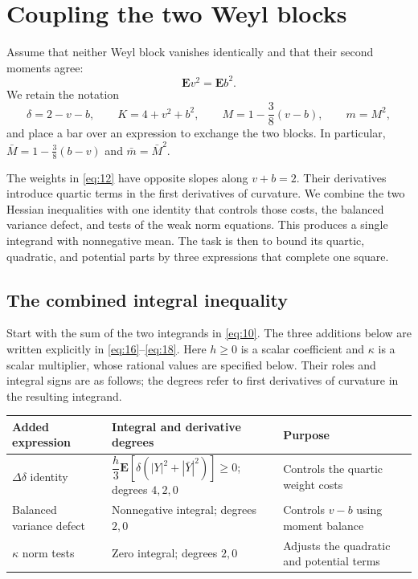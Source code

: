 \section{Coupling the two Weyl blocks}\label{sec:coupling}

Assume that neither Weyl block vanishes identically and that their second
moments agree:
\[
 \mathbf E v^2=\mathbf E b^2.
\]
We retain the notation
\[
 \delta=2-v-b,\qquad K=4+v^2+b^2,\qquad
 M=1-\frac38(v-b),\qquad m=M^2,
\]
and place a bar over an expression to exchange the two blocks. In
particular, $\bar M=1-\frac38(b-v)$ and $\bar m=\bar M^2$.

The weights in \eqref{eq:12} have opposite slopes along $v+b=2$.
Their derivatives introduce quartic terms in the first derivatives of
curvature. We combine the two Hessian inequalities with one identity that
controls those costs, the balanced variance defect, and tests of the weak
norm equations. This produces a single integrand with nonnegative mean.
The task is then to bound its quartic, quadratic, and potential parts by
three expressions that complete one square.

\subsection{The combined integral inequality}

Start with the sum of the two integrands in \eqref{eq:10}. The three
additions below are written explicitly in \eqref{eq:16}--\eqref{eq:18}.
Here $h\ge0$ is a scalar coefficient and $\kappa$ is a scalar multiplier,
whose rational values are specified below. Their roles and integral signs
are as follows; the degrees refer to first
derivatives of curvature in the resulting integrand.
\begin{center}
\small
\begin{tabular}{@{}p{}p{}p{}@{}}
\toprule
Added expression & Integral and derivative degrees & Purpose\\
\midrule
$\Delta\delta$ identity &
$\dfrac h3\mathbf E[\delta(|Y|^2+|\bar Y|^2)]\ge0$; degrees $4,2,0$ &
Controls the quartic weight costs\\
Balanced variance defect & Nonnegative integral; degrees $2,0$ &
Controls $v-b$ using moment balance\\
$\kappa$ norm tests & Zero integral; degrees $2,0$ &
Adjusts the quadratic and potential terms\\
\bottomrule
\end{tabular}
\end{center}

